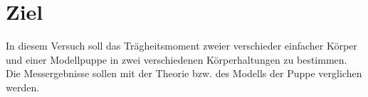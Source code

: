 \section{Ziel}
In diesem Versuch soll das Trägheitsmoment zweier verschieder einfacher Körper
und einer Modellpuppe in zwei verschiedenen Körperhaltungen zu bestimmen.
Die Messergebnisse sollen mit der Theorie bzw. des Modells der Puppe verglichen
werden.
\label{sec:Ziel}
